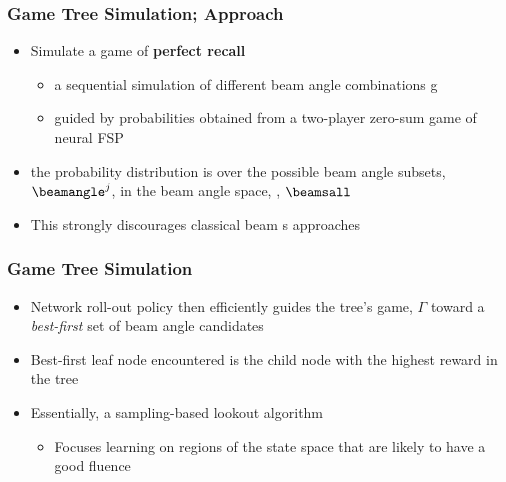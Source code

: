 \begin{frame}
\frametitle{Game Tree Simulation; Approach}
%
\begin{itemize}
	\item Simulate a game of \textbf{perfect recall} 
	\begin{itemize}
		\item a sequential simulation of different beam angle combinations g
		\item guided by probabilities obtained from a two-player zero-sum game of neural FSP 
	\end{itemize}
	\item  the probability distribution is over the possible beam angle subsets, $\beamangle^j$, in the beam angle space, , $\beamsall$
	\item This strongly discourages classical beam s approaches
\end{itemize}%
\end{frame}

\begin{frame}
	\frametitle{Game Tree Simulation}
	\begin{itemize}
		\item Network roll-out policy then efficiently guides the tree's game, $\Gamma$ toward a \textit{best-first} set of  beam angle candidates
		\item Best-first leaf node encountered is the child node with the highest reward in the tree
		\item Essentially, a sampling-based lookout algorithm 
		
		\begin{itemize}
			\item Focuses learning on regions of the state space that are likely to have a good fluence
		\end{itemize}  
	\end{itemize}
\end{frame}



